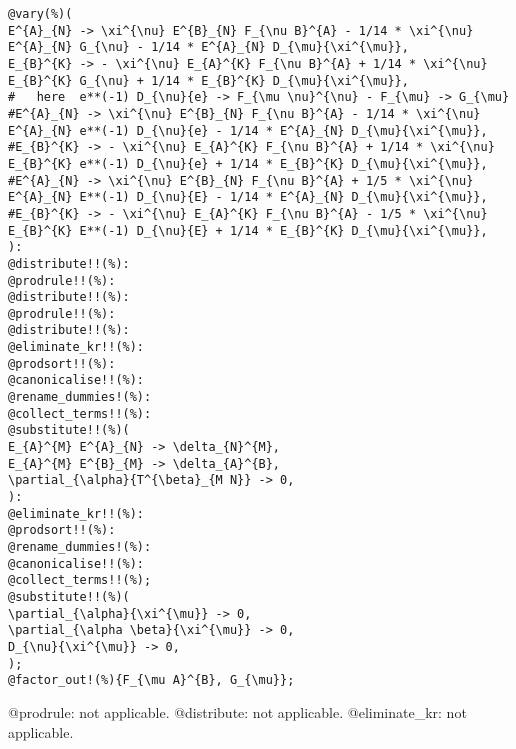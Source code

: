 \documentclass[11pt]{article}
\begin{document}
{\color[named]{Blue}\begin{verbatim}
@vary(%)(
E^{A}_{N} -> \xi^{\nu} E^{B}_{N} F_{\nu B}^{A} - 1/14 * \xi^{\nu} E^{A}_{N} G_{\nu} - 1/14 * E^{A}_{N} D_{\mu}{\xi^{\mu}},
E_{B}^{K} -> - \xi^{\nu} E_{A}^{K} F_{\nu B}^{A} + 1/14 * \xi^{\nu} E_{B}^{K} G_{\nu} + 1/14 * E_{B}^{K} D_{\mu}{\xi^{\mu}},
#   here  e**(-1) D_{\nu}{e} -> F_{\mu \nu}^{\nu} - F_{\mu} -> G_{\mu}
#E^{A}_{N} -> \xi^{\nu} E^{B}_{N} F_{\nu B}^{A} - 1/14 * \xi^{\nu} E^{A}_{N} e**(-1) D_{\nu}{e} - 1/14 * E^{A}_{N} D_{\mu}{\xi^{\mu}},
#E_{B}^{K} -> - \xi^{\nu} E_{A}^{K} F_{\nu B}^{A} + 1/14 * \xi^{\nu} E_{B}^{K} e**(-1) D_{\nu}{e} + 1/14 * E_{B}^{K} D_{\mu}{\xi^{\mu}},
#E^{A}_{N} -> \xi^{\nu} E^{B}_{N} F_{\nu B}^{A} + 1/5 * \xi^{\nu} E^{A}_{N} E**(-1) D_{\nu}{E} - 1/14 * E^{A}_{N} D_{\mu}{\xi^{\mu}},
#E_{B}^{K} -> - \xi^{\nu} E_{A}^{K} F_{\nu B}^{A} - 1/5 * \xi^{\nu} E_{B}^{K} E**(-1) D_{\nu}{E} + 1/14 * E_{B}^{K} D_{\mu}{\xi^{\mu}},
):
@distribute!!(%):
@prodrule!!(%):
@distribute!!(%):
@prodrule!!(%):
@distribute!!(%):
@eliminate_kr!!(%):
@prodsort!!(%):
@canonicalise!!(%):
@rename_dummies!(%):
@collect_terms!!(%):
@substitute!!(%)(
E_{A}^{M} E^{A}_{N} -> \delta_{N}^{M},
E_{A}^{M} E^{B}_{M} -> \delta_{A}^{B},
\partial_{\alpha}{T^{\beta}_{M N}} -> 0,
):
@eliminate_kr!!(%):
@prodsort!!(%):
@rename_dummies!(%):
@canonicalise!!(%):
@collect_terms!!(%);
@substitute!!(%)(
\partial_{\alpha}{\xi^{\mu}} -> 0,
\partial_{\alpha \beta}{\xi^{\mu}} -> 0,
D_{\nu}{\xi^{\mu}} -> 0,
);
@factor_out!(%){F_{\mu A}^{B}, G_{\mu}};
\end{verbatim}}
@prodrule: not applicable.
@distribute: not applicable.
@eliminate\_kr: not applicable.
\end{document}

